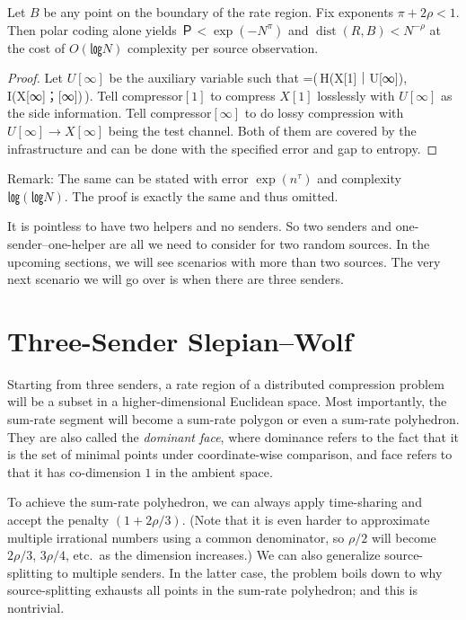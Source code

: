 \documentclass[openany]{amsbook}
\makeatletter
\numberwithin{equation}{chapter}
\numberwithin{figure}{chapter}
\numberwithin{table}{chapter}
\def\bigl@C#1{\bigl#1}					\def\bigr@C#1{\bigr#1}
\def\({\bigl@C(}	\def\){\bigr@C)}	令（{\Bigl(}			令）{\Bigr)}
\DeclareMathOperator\dist{dist}
\def\[#1\]{\begin{equation*}{#1}\end{equation*}}
\theoremstyle{definition}	理dfn:Definition~?s			理exa:Example~?s
\theoremstyle{remark}		理cla:Claim~?s				理rem:Remark~?s
\makeatother
\begin{document}
	\begin{thm}
		Let $B$ be any point on the boundary of the rate region.
		Fix exponents $π+2ρ<1$.
		Then polar coding alone yields $Ｐ<\exp(-N^π)$ and $\dist(R,B)<N^{-ρ}$
		at the cost of $O(㏒N)$ complexity per source observation.
	\end{thm}
	
	\begin{proof}
		Let $U[∞]$ be the auxiliary variable such that
		\[B=\(\,H(X[1]｜U[∞]),\,I(X[∞]；[∞])\,\).\]
		Tell compressor$[1]$ to compress $X[1]$
		losslessly with $U[∞]$ as the side information.
		Tell compressor$[∞]$ to do lossy compression
		with $U[∞]→X[∞]$ being the test channel.
		Both of them are covered by the infrastructure and
		can be done with the specified error and gap to entropy.
	\end{proof}
	
	Remark:
	The same can be stated with error $\exp(n^τ)$ and complexity $㏒(㏒N)$.
	The proof is exactly the same and thus omitted.
	
	It is pointless to have two helpers and no senders.
	So two senders and one-sender--one-helper are
	all we need to consider for two random sources.
	In the upcoming sections, we will see scenarios with more than two sources.
	The very next scenario we will go over is when there are three senders.

\section{Three-Sender Slepian--Wolf}

	Starting from three senders, a rate region of a distributed compression problem
	will be a subset in a higher-dimensional Euclidean space.
	Most importantly, the sum-rate segment will become
	a sum-rate polygon or even a sum-rate polyhedron.
	They are also called the \emph{dominant face}, where dominance refers to
	the fact that it is the set of minimal points under coordinate-wise comparison,
	and face refers to that it has co-dimension $1$ in the ambient space.
	
	To achieve the sum-rate polyhedron, we can always
	apply time-sharing and accept the penalty $(1+2ρ/3)$.
	(Note that it is even harder to approximate
	multiple irrational numbers using a common denominator,
	so $ρ/2$ will become $2ρ/3$, $3ρ/4$, etc.\ as the dimension increases.)
	We can also generalize source-splitting to multiple senders.
	In the latter case, the problem boils down to
	why source-splitting exhausts all points in the sum-rate polyhedron;
	and this is nontrivial.
	
\end{document}
